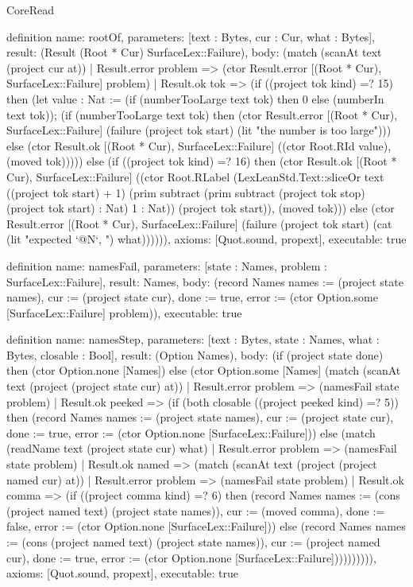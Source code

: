 \begin{lexlean}{CoreRead}
\begin{semanticmodule}
definition{
  name: rootOf,
  parameters: [text : Bytes, cur : Cur, what : Bytes],
  result: (Result (Root * Cur) SurfaceLex::Failure),
  body: (match (scanAt text (project cur at))
    | Result.error problem => (ctor Result.error [(Root * Cur), SurfaceLex::Failure] problem)
    | Result.ok tok => (if ((project tok kind) =? 15) then (let value : Nat := (if (numberTooLarge text tok) then 0 else (numberIn text tok)); (if (numberTooLarge text tok) then (ctor Result.error [(Root * Cur), SurfaceLex::Failure] (failure (project tok start) (lit "the number is too large"))) else (ctor Result.ok [(Root * Cur), SurfaceLex::Failure] ((ctor Root.RId value), (moved tok))))) else (if ((project tok kind) =? 16) then (ctor Result.ok [(Root * Cur), SurfaceLex::Failure] ((ctor Root.RLabel (LexLeanStd.Text::sliceOr text ((project tok start) + 1) (prim subtract (prim subtract (project tok stop) (project tok start) : Nat) 1 : Nat)) (project tok start)), (moved tok))) else (ctor Result.error [(Root * Cur), SurfaceLex::Failure] (failure (project tok start) (cat (lit "expected `@N`, ") what)))))),
  axioms: [Quot.sound, propext],
  executable: true
}

definition{
  name: namesFail,
  parameters: [state : Names, problem : SurfaceLex::Failure],
  result: Names,
  body: (record Names {names := (project state names), cur := (project state cur), done := true, error := (ctor Option.some [SurfaceLex::Failure] problem)}),
  executable: true
}

definition{
  name: namesStep,
  parameters: [text : Bytes, state : Names, what : Bytes, closable : Bool],
  result: (Option Names),
  body: (if (project state done) then (ctor Option.none [Names]) else (ctor Option.some [Names] (match (scanAt text (project (project state cur) at))
    | Result.error problem => (namesFail state problem)
    | Result.ok peeked => (if (both closable ((project peeked kind) =? 5)) then (record Names {names := (project state names), cur := (project state cur), done := true, error := (ctor Option.none [SurfaceLex::Failure])}) else (match (readName text (project state cur) what)
      | Result.error problem => (namesFail state problem)
      | Result.ok named => (match (scanAt text (project (project named cur) at))
        | Result.error problem => (namesFail state problem)
        | Result.ok comma => (if ((project comma kind) =? 6) then (record Names {names := (cons (project named text) (project state names)), cur := (moved comma), done := false, error := (ctor Option.none [SurfaceLex::Failure])}) else (record Names {names := (cons (project named text) (project state names)), cur := (project named cur), done := true, error := (ctor Option.none [SurfaceLex::Failure])})))))))),
  axioms: [Quot.sound, propext],
  executable: true
}


\end{semanticmodule}
\end{lexlean}
